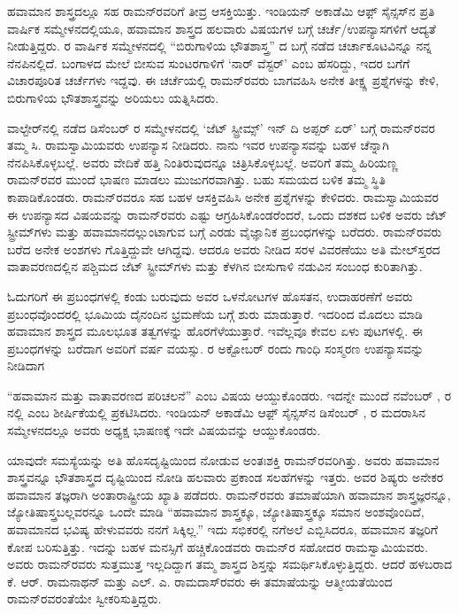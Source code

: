 ಹವಾಮಾನ ಶಾಸ್ತ್ರದಲ್ಲೂ ಸಹ ರಾಮನ್‍ರವರಿಗೆ ತೀವ್ರ ಆಸಕ್ತಿಯಿತ್ತು. ಇಂಡಿಯನ್ ಅಕಾಡೆಮಿ ಆಫ಼್ ಸೈನ್ಸಸ್‌ನ ಪ್ರತಿ ವಾರ್ಷಿಕ ಸಮ್ಮೇಳನದಲ್ಲಿಯೂ, ಹವಾಮಾನ ಶಾಸ್ತ್ರದ ಹಲವಾರು ವಿಷಯಗಳ ಬಗ್ಗೆ ಚರ್ಚೆ/ಉಪನ್ಯಾಸಗಳಿಗೆ ಆದ್ಯತೆ ನೀಡುತ್ತಿದ್ದರು.  ರ ವಾರ್ಷಿಕ ಸಮ್ಮೇಳನದಲ್ಲಿ “ಬಿರುಗಾಳಿಯ ಭೌತಶಾಸ್ತ್ರ” ದ ಬಗ್ಗೆ ನಡೆದ ಚರ್ಚಾಕೂಟವಿನ್ನೂ ನನ್ನ ನೆನಪಿನಲ್ಲಿದೆ. ಬಂಗಾಳದ ಮೇಲೆ ಬೀಸುವ ಸುಂಟರಗಾಳಿಗೆ ‘ನಾರ್ ವೆಸ್ಟರ್’ ಎಂಬ ಹೆಸರಿದ್ದು, ಇದರ ಬಗೆಗೆ ವಿಚಾರಪೂರಿತ ಚರ್ಚೆಗಳು ಇದ್ದವು. ಈ ಚರ್ಚೆಯಲ್ಲಿ ರಾಮನ್‌ರವರು ಬಾಗವಹಿಸಿ ಅನೇಕ ತೀಕ್ಷ್ಣ ಪ್ರಶ್ನೆಗಳನ್ನು ಕೇಳಿ, ಬಿರುಗಾಳಿಯ ಭೌತಶಾಸ್ತ್ರವನ್ನು ಅರಿಯಲು ಯತ್ನಿಸಿದರು.

ವಾಲ್ಟೇರ್‌ನಲ್ಲಿ ನಡೆದ ಡಿಸೆಂಬರ್  ರ ಸಮ್ಮೇಳನದಲ್ಲಿ ‘ಜೆಟ್ ಸ್ಟ್ರೀಮ್ಸ್’ ಇನ್ ದಿ ಅಪ್ಪರ್ ಏರ್’ ಬಗ್ಗೆ ರಾಮನ್‌ರವರ ತಮ್ಮ ಸಿ. ರಾಮಸ್ವಾಮಿಯವರು ಉಪನ್ಯಾಸ ನೀಡಿದರು. ನಾನು ಇವರ ಉಪನ್ಯಾಸವನ್ನು ಬಹಳ ಚೆನ್ನಾಗಿ ನೆನಪಿಸಿಕೊಳ್ಳಬಲ್ಲೆ. ಅವರು ವೇದಿಕೆ ಹತ್ತಿ ನಿಂತಿರುವುದನ್ನೂ ಚಿತ್ರಿಸಿಕೊಳ್ಳಬಲ್ಲೆ. ಅವರಿಗೆ ತಮ್ಮ ಹಿರಿಯಣ್ಣ ರಾಮನ್‌ರವರ ಮುಂದೆ ಭಾಷಣ ಮಾಡಲು ಮುಜುಗರವಾಗಿತ್ತು. ಬಹು ಸಮಯದ ಬಳಿಕ ತಮ್ಮ ಸ್ಥಿತಿ ಕಾಪಾಡಿಕೊಂಡರು. ರಾಮನ್‌ರವರೂ ಸಹ ಬಹಳ ಆಸಕ್ತಿವಹಿಸಿ ಅನೇಕ ಪ್ರಶ್ನೆಗಳನ್ನು ಕೇಳಿದರು. ರಾಮಸ್ವಾಮಿಯವರ ಈ ಉಪನ್ಯಾಸದ ವಿಷಯವನ್ನು ರಾಮನ್‌ರವರು ಎಷ್ಟು ಆಗ್ರಹಿಸಿಕೊಂಡರೆಂದರೆ, ಒಂದು ದಶಕದ ಬಳಿಕ ಅವರು ಜೆಟ್ ಸ್ಟ್ರೀಮ್‌ಗಳು ಮತ್ತು ಹವಾಮಾನದಲ್ಲುಂಟಾಗುವ  ಬಗ್ಗೆ ಎರಡು ವೈಜ್ಞಾನಿಕ ಪ್ರಬಂಧಗಳನ್ನು ಬರೆದರು. ರಾಮನ್‌ರವರು ಬರೆದ ಅನೇಕ ಅಂಶಗಳು ಗೊತ್ತಿದ್ದುವೇ ಆಗಿದ್ದವು. ಆದರೂ ಅವರು ನೀಡಿದ ಸರಳ ವಿವರಣೆಯು ಅತಿ ಮೇಲ್‌ಸ್ತರದ ವಾತಾವರಣದಲ್ಲಿನ ಪಶ್ಚಿಮದ ಜೆಟ್‌ ಸ್ಟ್ರೀಮ್‌ಗಳು ಮತ್ತು ಕೆಳಗಿನ ಬೀಸುಗಾಳಿ ನಡುವಿನ ಸಂಬಂಧ ಕುರಿತಾಗಿತ್ತು.

ಓದುಗರಿಗೆ ಈ ಪ್ರಬಂಧಗಳಲ್ಲಿ ಕಂಡು ಬರುವುದು ಅವರ ಒಳನೋಟಗಳ ಹೊಸತನ, ಉದಾಹರಣೆಗೆ ಅವರು ಪ್ರಬಂಧವೊಂದರಲ್ಲಿ ಭೂಮಿಯ ದೈನಂದಿನ ಭ್ರಮಣೆಯ ಬಗ್ಗೆ ಶುರು ಮಾಡುತ್ತಾರೆ. ಇದರಿಂದ ಮೊದಲು ಮಾಡಿ ಹವಾಮಾನ ಶಾಸ್ತ್ರದ ಮೂಲಭೂತ ತತ್ವಗಳನ್ನು ಹೊರಗೆಳೆಯುತ್ತಾರೆ. ಇವೆಲ್ಲವೂ ಕೇವಲ ಏಳು ಪುಟಗಳಲ್ಲಿ. ಈ ಪ್ರಬಂಧಗಳನ್ನು ಬರೆದಾಗ ಅವರಿಗೆ  ವರ್ಷ ವಯಸ್ಸು. ರ ಅಕ್ಟೋಬರ್  ರಂದು ಗಾಂಧಿ ಸಂಸ್ಮರಣ ಉಪನ್ಯಾಸವನ್ನು ನೀಡಿದಾಗ 

“ಹವಾಮಾನ ಮತ್ತು ವಾತಾವರಣದ ಪರಿಚಲನೆ” ಎಂಬ ವಿಷಯ ಆಯ್ದುಕೊಂಡರು. ಇದನ್ನೇ ಮುಂದೆ ನವೆಂಬರ್ , ರ  ನಲ್ಲಿ  ಎಂಬ ಶೀರ್ಷಿಕೆಯಲ್ಲಿ ಪ್ರಕಟಿಸಿದರು. ಇಂಡಿಯನ್ ಅಕಾಡೆಮಿ ಆಫ಼್ ಸೈನ್ಸಸ್‍ನ ಡಿಸೆಂಬರ್ ,  ರ ಮದರಾಸಿನ ಸಮ್ಮೇಳನದಲ್ಲೂ ಅವರು ಅಧ್ಯಕ್ಷ ಭಾಷಣಕ್ಕೆ ಇದೇ ವಿಷಯವನ್ನು ಆಯ್ದುಕೊಂಡರು.

ಯಾವುದೇ ಸಮಸ್ಯೆಯನ್ನು ಅತಿ ಹೊಸದೃಷ್ಟಿಯಿಂದ ನೋಡುವ ಅಂತಃಶಕ್ತಿ ರಾಮನ್‌ರವರಿಗಿತ್ತು. ಅವರು ಹವಾಮಾನ ಶಾಸ್ತ್ರವನ್ನೂ ಭೌತಶಾಸ್ತ್ರದ ದೃಷ್ಟಿಯಿಂದ ನೋಡಿ ಹಲವಾರು ಪ್ರಕಾಂಡ ಸಲಹೆಗಳನ್ನು ಇತ್ತರು. ಅವರ ಶಿಷ್ಯರು ಅನೇಕರ ಹವಾಮಾನ ತಜ್ಞರಾಗಿ ಅಂತಾರಾಷ್ಟ್ರೀಯ ಖ್ಯಾತಿ ಪಡೆದರು. ರಾಮನ್‌ರವರು ತಮಾಷೆಯಾಗಿ ಹವಾಮಾನ ಶಾಸ್ತ್ರಜ್ಞರನ್ನೂ, ಜ್ಯೋತಿಷಾಸ್ತ್ರಬಲ್ಲವರನ್ನೂ ಒಂದೇ ಮಾಡಿ “ಹವಾಮಾನ ಶಾಸ್ತ್ರಕ್ಕೂ, ಜ್ಯೋತಿಷಾಸ್ತ್ರಕ್ಕೂ ಸಮಾನ ಅಂಶವೊಂದಿದೆ, ಹವಾಮಾನದ ಭವಿಷ್ಯ ಹೇಳುವವರು ನನಗೆ ಸಿಕ್ಕಿಲ್ಲ.” ಇದು ಸಭಿಕರಲ್ಲಿ ನಗೆಅಲೆ ಎಬ್ಬಿಸಿದರೂ, ಹವಾಮಾನ ತಜ್ಞರಿಗೆ ಕೋಪ ಬರಿಸುತ್ತಿತ್ತು. ಇದನ್ನು ಬಹಳ ಮನಸ್ಸಿಗೆ ಹಚ್ಚಿಕೊಂಡವರು ರಾಮನ್‌ರ ಸಹೋದರ ರಾಮಸ್ವಾಮಿಯವರು. ಅವರು ರಾಮನ್‌ರವರು ಸುತ್ತಮುತ್ತ ಇಲ್ಲದಿದ್ದಾಗ ತಮ್ಮ ಶಾಸ್ತ್ರದ ಶಿಸ್ತನ್ನು ಸಮರ್ಥಿಸಿಕೊಳ್ಳುತ್ತಿದ್ದರು. ಆದರೆ ಹಳಬರಾದ ಕೆ. ಆರ್. ರಾಮನಾಥನ್ ಮತ್ತು ಎಲ್. ಎ. ರಾಮದಾಸ್‌ರವರು ಈ ತಮಾಷೆಯನ್ನು ಆತ್ಮೀಯತೆಯಿಂದ ರಾಮನ್‌ರವರಂತೆಯೇ ಸ್ವೀಕರಿಸುತ್ತಿದ್ದರು.

